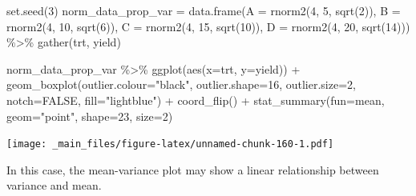 \documentclass[
]{book}
\newenvironment{Shaded}{\begin{snugshade}}{\end{snugshade}}
\newcommand{\AttributeTok}[1]{\textcolor[rgb]{0.77,0.63,0.00}{#1}}
\newcommand{\ConstantTok}[1]{\textcolor[rgb]{0.00,0.00,0.00}{#1}}
\newcommand{\DecValTok}[1]{\textcolor[rgb]{0.00,0.00,0.81}{#1}}
\newcommand{\FunctionTok}[1]{\textcolor[rgb]{0.00,0.00,0.00}{#1}}
\newcommand{\NormalTok}[1]{#1}
\newcommand{\OtherTok}[1]{\textcolor[rgb]{0.56,0.35,0.01}{#1}}
\newcommand{\SpecialCharTok}[1]{\textcolor[rgb]{0.00,0.00,0.00}{#1}}
\newcommand{\StringTok}[1]{\textcolor[rgb]{0.31,0.60,0.02}{#1}}
\begin{document}
\begin{Shaded}
\begin{Highlighting}[]
\FunctionTok{set.seed}\NormalTok{(}\DecValTok{3}\NormalTok{)}
\NormalTok{norm\_data\_prop\_var }\OtherTok{=} \FunctionTok{data.frame}\NormalTok{(}\AttributeTok{A =} \FunctionTok{rnorm2}\NormalTok{(}\DecValTok{4}\NormalTok{, }\DecValTok{5}\NormalTok{, }\FunctionTok{sqrt}\NormalTok{(}\DecValTok{2}\NormalTok{)),}
                                \AttributeTok{B =} \FunctionTok{rnorm2}\NormalTok{(}\DecValTok{4}\NormalTok{, }\DecValTok{10}\NormalTok{, }\FunctionTok{sqrt}\NormalTok{(}\DecValTok{6}\NormalTok{)),}
                                \AttributeTok{C =} \FunctionTok{rnorm2}\NormalTok{(}\DecValTok{4}\NormalTok{, }\DecValTok{15}\NormalTok{, }\FunctionTok{sqrt}\NormalTok{(}\DecValTok{10}\NormalTok{)),}
                                \AttributeTok{D =} \FunctionTok{rnorm2}\NormalTok{(}\DecValTok{4}\NormalTok{, }\DecValTok{20}\NormalTok{, }\FunctionTok{sqrt}\NormalTok{(}\DecValTok{14}\NormalTok{))) }\SpecialCharTok{\%\textgreater{}\%}
  \FunctionTok{gather}\NormalTok{(trt, yield)}
  
  
  
  



\NormalTok{norm\_data\_prop\_var }\SpecialCharTok{\%\textgreater{}\%}
        \FunctionTok{ggplot}\NormalTok{(}\FunctionTok{aes}\NormalTok{(}\AttributeTok{x=}\NormalTok{trt, }\AttributeTok{y=}\NormalTok{yield)) }\SpecialCharTok{+} 
        \FunctionTok{geom\_boxplot}\NormalTok{(}\AttributeTok{outlier.colour=}\StringTok{"black"}\NormalTok{, }\AttributeTok{outlier.shape=}\DecValTok{16}\NormalTok{,}
             \AttributeTok{outlier.size=}\DecValTok{2}\NormalTok{, }\AttributeTok{notch=}\ConstantTok{FALSE}\NormalTok{, }\AttributeTok{fill=}\StringTok{"lightblue"}\NormalTok{) }\SpecialCharTok{+}
        \FunctionTok{coord\_flip}\NormalTok{() }\SpecialCharTok{+}
        \FunctionTok{stat\_summary}\NormalTok{(}\AttributeTok{fun=}\NormalTok{mean, }\AttributeTok{geom=}\StringTok{"point"}\NormalTok{, }\AttributeTok{shape=}\DecValTok{23}\NormalTok{, }\AttributeTok{size=}\DecValTok{2}\NormalTok{)}
\end{Highlighting}
\end{Shaded}

\texttt{[image: \_main\_files/figure-latex/unnamed-chunk-160-1.pdf]}

In this case, the mean-variance plot may show a linear relationship between variance and mean.
\end{document}
